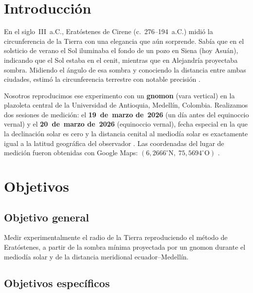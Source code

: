 \documentclass[12pt,a4paper]{article}
\begin{document}
\section{Introducción}

En el siglo~III~a.C., Eratóstenes de Cirene (c.~276--194~a.C.) midió la
circunferencia de la Tierra con una elegancia que aún sorprende.
Sabía que en el solsticio de verano el Sol iluminaba el fondo de un pozo
en Siena (hoy Asuán), indicando que el Sol estaba en el cenit, mientras
que en Alejandría proyectaba sombra.
Midiendo el ángulo de esa sombra y conociendo la distancia entre ambas
ciudades, estimó la circunferencia terrestre con notable precisión
\citep{Britannica2024}.

Nosotros reproducimos ese experimento con un \textbf{gnomon} (vara
vertical) en la plazoleta central de la Universidad de Antioquia,
Medellín, Colombia.
Realizamos dos sesiones de medición: el \textbf{19~de~marzo de~2026}
(un día antes del equinoccio vernal) y el \textbf{20~de~marzo de~2026}
(equinoccio vernal), fecha especial en la que la declinación solar es
cero y la distancia cenital al mediodía solar es exactamente igual a la
latitud geográfica del observador \citep{PortillaBarbosa2009}.
Las coordenadas del lugar de medición fueron obtenidas con Google Maps:
$(6{,}2666^\circ\text{N},\; 75{,}5694^\circ\text{O})$ \citep{GoogleMaps2026}.

\section{Objetivos}

\subsection{Objetivo general}

Medir experimentalmente el radio de la Tierra reproduciendo el método de
Eratóstenes, a partir de la sombra mínima proyectada por un gnomon
durante el mediodía solar y de la distancia meridional
ecuador--Medellín.

\subsection{Objetivos específicos}
\end{document}
